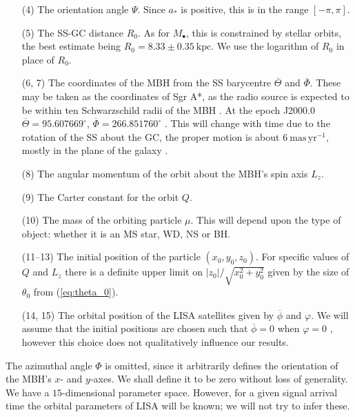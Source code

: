 \documentclass[useAMS,usedcolumn,usegraphicx,usenatbib]{mn2e}
\newcommand{\eqnref}[1]{(\ref{eq:#1})}
\newcommand{\units}[1]{\ensuremath{~\mathrm{#1}}}
\begin{document}
\begin{enumerate}
\item[(4)] The orientation angle $\Psi$. Since $a_\ast$ is positive, this is in the range $[-\pi, \pi]$.
\item[(5)] The SS-GC distance $R_0$. As for $M_\bullet$, this is constrained by stellar orbits, the best estimate being \citep{Gillessen2009} $R_0 = 8.33 \pm 0.35\units{kpc}$. We use the logarithm of $R_0$ in place of $R_0$.
\item[(6, 7)] The coordinates of the MBH from the SS barycentre $\overline{\Theta}$ and $\overline{\Phi}$. These may be taken as the coordinates of Sgr A*, as the radio source is expected to be within ten Schwarzschild radii of the MBH \citep{Reid2003,Doeleman2008}. At the epoch J2000.0 $\overline{\Theta} = {95.607669}^{\circ}$, $\overline{\Phi} = {266.851760}^{\circ}$ \citep{Reid1999}. This will change with time due to the rotation of the SS about the GC, the proper motion is about $6\units{mas\,yr^{-1}}$, mostly in the plane of the galaxy \citep{Reid1999, Backer1999, Reid2003}.
\item[(8)] The angular momentum of the orbit about the MBH's spin axis $L_z$.
\item[(9)] The Carter constant for the orbit $Q$.
\item[(10)] The mass of the orbiting particle $\mu$. This will depend upon the type of object: whether it is an MS star, WD, NS or BH.
\item[(11--13)] The initial position of the particle $(x_0, y_0, z_0)$. For specific values of $Q$ and $L_z$ there is a definite upper limit on $|z_0|/\sqrt{x_0^2+y_0^2}$ given by the size of $\theta_0$ from \eqnref{theta_0}.
\item[(14, 15)] The orbital position of the LISA satellites given by $\overline{\phi}$ and $\varphi$. We will assume that the initial positions are chosen such that $\overline{\phi} = 0$ when $\varphi = 0$ \citep{Cutler1998}, however this choice does not qualitatively influence our results.\\
\end{enumerate}%
The azimuthal angle $\Phi$ is omitted, since it arbitrarily defines the orientation of the MBH's $x$- and $y$-axes. We shall define it to be zero without loss of generality. We have a $15$-dimensional parameter space. However, for a given signal arrival time the orbital parameters of LISA will be known; we will not try to infer these.
\end{document}
